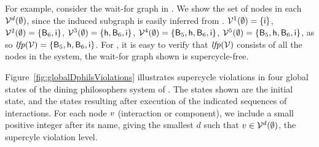 \vspace{1ex}
\begin{example}
For example, consider the wait-for graph in . We show the set of nodes in each $\mathcal{V}^{d}(\emptyset)$, since the induced subgraph is easily inferred from .
$\mathcal{V}^{1}(\emptyset)  = \{ \mathsf{i} \}$, 
$\mathcal{V}^{2}(\emptyset) = \{ \mathsf{B}_6, \mathsf{i} \}$, 
$\mathcal{V}^{3}(\emptyset)  = \{ \mathsf{h}, \mathsf{B}_6, \mathsf{i} \}$, 
$\mathcal{V}^{4}(\emptyset)  = \{ \mathsf{B}_5, \mathsf{h}, \mathsf{B}_6, \mathsf{i} \}$, 
$\mathcal{V}^{5}(\emptyset)  = \{ \mathsf{B}_5, \mathsf{h}, \mathsf{B}_6, \mathsf{i} \}$, 
as so $\mathit{lfp}(\mathcal{V}) = \{ \mathsf{B}_5, \mathsf{h}, \mathsf{B}_6, \mathsf{i} \}$.
%
For , it is easy to verify that $\mathit{lfp}(\mathcal{V})$ consists of all the nodes in the system, \ie the wait-for graph shown is supercycle-free.
\end{example}


\begin{example}
\label{exm:glob-dphils-viols}
Figure~\ref{fig:globalDphilsViolations} illustrates supercycle violations in four global states of the dining philosophers system of .
The states shown are the initial state, and the states resulting after execution of the indicated sequences of interactions.
For each node $\mathit{v}$ (interaction or component), we include a small
positive integer after its name, giving the smallest $d$ such that $v \in \mathcal{V}^{d}(\emptyset)$,
\ie the supercyle violation level.
\end{example}


\begin{figure*}[ht]
  \begin{center}
       \quad \quad
       \quad \quad
      \caption{Example supercycle violations for dining philosophers system of Figure~\ref{fig:diningSpectrum}.}
       \label{fig:globalDphilsViolations}
  \end{center}
\end{figure*}








